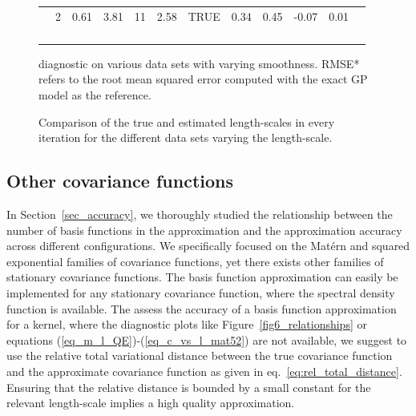 \begin{figure}
\begin{tabular}{ c c c c c c c c c c | c c}
 & 2 & 0.61 & 3.81 & 11 & 2.58 & TRUE & 0.34 & 0.45 & -0.07 & 0.01 & \\
 \\
 \\
 \\[1mm]
\arrayrulecolor{gray}\hline
\end{tabular}
\caption{diagnostic on various data sets with varying smoothness. RMSE* refers to the root mean squared error computed with the exact GP model as the reference.}
  \label{fig9_diagnostic}
\end{figure}

\begin{figure}
\centering
{}
\caption{Comparison of the true and estimated length-scales in every iteration for the different data sets varying the length-scale.}
  \label{fig10_diagnostic_lscale_comparison}
\end{figure}

\subsection{Other covariance functions}

In Section~\ref{sec_accuracy}, we thoroughly studied the relationship between the number of basis functions in the approximation and the approximation accuracy across different configurations. We specifically focused on the Mat\'ern and squared exponential families of covariance functions, yet there exists other families of stationary covariance functions. The basis function approximation can easily be implemented for any stationary covariance function, where the spectral density function is available. The assess the accuracy of a basis function approximation for a kernel, where the diagnostic plots like Figure~\ref{fig6_relationships} or equations (\ref{eq_m_l_QE})-(\ref{eq_c_vs_l_mat52}) are not available, we suggest to use the relative total variational distance between the true covariance function and the approximate covariance function as given in eq.~\eqref{eq:rel_total_distance}. Ensuring that the relative distance is bounded by a small constant for the relevant length-scale implies a high quality approximation.

